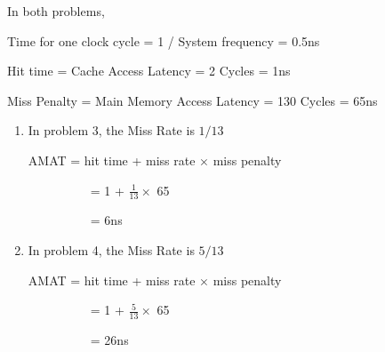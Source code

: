 \begin{questions}
{
    \pagebreak
    \begin{solution}

        In both problems, 

        Time for one clock cycle = 1 / System frequency = 0.5ns

        Hit time = Cache Access Latency = 2 Cycles = 1ns

        Miss Penalty = Main Memory Access Latency = 130 Cycles = 65ns

        \begin{enumerate}
            \item In problem 3, the Miss Rate is $1/13$
            
            AMAT = hit time + miss rate $\times$ miss penalty

            \ \ \ \ \ \ \ \ \ \ = 1 + $\frac{1}{13} \times $ 65

            \ \ \ \ \ \ \ \ \ \ = 6ns

            \item In problem 4, the Miss Rate is $5/13$
            
            AMAT = hit time + miss rate $\times$ miss penalty

            \ \ \ \ \ \ \ \ \ \ = 1 + $\frac{5}{13} \times $ 65

            \ \ \ \ \ \ \ \ \ \ = 26ns

        \end{enumerate}

        \vspace{1in}
    \end{solution}
}


\end{questions}
